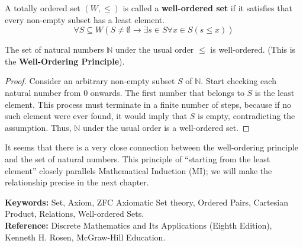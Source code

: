 \begin{definition}
A totally ordered set $(W, \le)$ is called a \textbf{well-ordered set} if it satisfies that every non-empty subset has a least element.
$$ \forall S \subseteq W (S \ne \emptyset \to \exists s \in S \forall x \in S (s \le x)) $$
\end{definition}

\begin{theorem}
The set of natural numbers $\mathbb{N}$ under the usual order $\le$ is well-ordered. (This is the \textbf{Well-Ordering Principle}).
\end{theorem}
\begin{proof}
Consider an arbitrary non-empty subset $S$ of $\mathbb{N}$. Start checking each natural number from 0 onwards. The first number that belongs to $S$ is the least element. This process must terminate in a finite number of steps, because if no such element were ever found, it would imply that $S$ is empty, contradicting the assumption. Thus, $\mathbb{N}$ under the usual order is a well-ordered set.
\end{proof}

It seems that there is a very close connection between the well-ordering principle and the set of natural numbers. This principle of “starting from the least element” closely parallels Mathematical Induction (MI); we will make the relationship precise in the next chapter.

\noindent
\textbf{Keywords:} Set, Axiom, ZFC Axiomatic Set theory, Ordered Pairs, Cartesian Product, Relations, Well-ordered Sets. \\
\textbf{Reference:} Discrete Mathematics and Its Applications (Eighth Edition), Kenneth H. Rosen, McGraw-Hill Education.

\cleardoublepage

